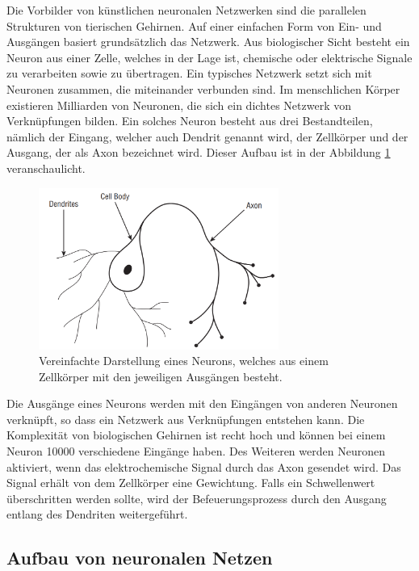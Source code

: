 Die Vorbilder von künstlichen neuronalen Netzwerken sind die parallelen Strukturen von tierischen Gehirnen\cite{Bell2014}. Auf einer einfachen Form von Ein- und Ausgängen basiert grundsätzlich das Netzwerk. Aus biologischer Sicht besteht ein Neuron aus einer Zelle, welches in der Lage ist, chemische oder elektrische Signale zu verarbeiten sowie zu übertragen. Ein typisches Netzwerk setzt sich mit Neuronen zusammen, die miteinander verbunden sind. Im menschlichen Körper existieren Milliarden von Neuronen, die sich ein dichtes Netzwerk von Verknüpfungen bilden. Ein solches Neuron besteht aus drei Bestandteilen, nämlich der Eingang, welcher auch Dendrit genannt wird, der Zellkörper und der Ausgang, der als Axon bezeichnet wird. Dieser Aufbau ist in der Abbildung \ref{neural_human} veranschaulicht. 

\begin{figure}[h!]
	\centering
	\includegraphics[width=0.7\textwidth]{bilder/neural_human.PNG}
	\caption{Vereinfachte Darstellung eines Neurons, welches aus einem Zellkörper mit den jeweiligen Ausgängen besteht\cite{Bell2014}.}
	\label{neural_human}
\end{figure}

Die Ausgänge eines Neurons werden mit den Eingängen von anderen Neuronen verknüpft, so dass ein Netzwerk aus Verknüpfungen entstehen kann. Die Komplexität von biologischen Gehirnen ist recht hoch und können bei einem Neuron 10000 verschiedene Eingänge haben. Des Weiteren werden Neuronen aktiviert, wenn das elektrochemische Signal durch das Axon gesendet wird. Das Signal erhält von dem Zellkörper eine Gewichtung. Falls ein Schwellenwert überschritten werden sollte, wird der Befeuerungsprozess durch den Ausgang entlang des Dendriten weitergeführt\cite{Bell2014}.

\subsection{Aufbau von neuronalen Netzen}

